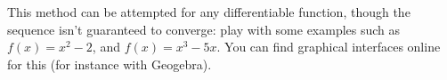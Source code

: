This method can be attempted for any differentiable function, though the sequence isn't guaranteed to converge: play with some examples such as $f(x)=x^2-2$, and $f(x)=x^3-5x$. You can find graphical interfaces online for this (for instance with Geogebra).

